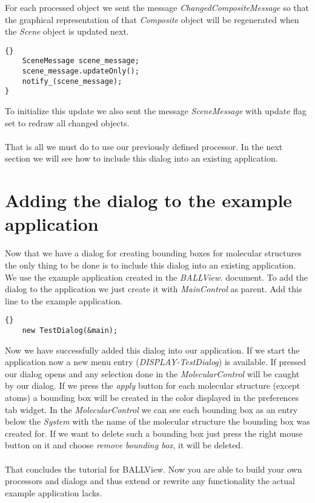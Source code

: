 For each processed object we sent the message {\em ChangedCompositeMessage} so
that the graphical representation of that {\em Composite} object will be regenerated
when the {\em Scene} object is updated next.			

\begin{lstlisting}{}
	SceneMessage scene_message;
	scene_message.updateOnly();
	notify_(scene_message);
}
\end{lstlisting}

To initialize this update we also sent the message {\em SceneMessage} with 
update flag set to redraw all changed objects.\\ \\

That is all we must do to use our previously defined processor. In the next section
we will see how to include this dialog into an existing application.



\section{Adding the dialog to the example application}
\label{section:adding_the_dialog}

Now that we have a dialog for creating bounding boxes for molecular structures
the only thing to be done is to include this dialog into an existing application.
We use the example application created in the {\em BALLView.} document.
To add the dialog to the application we just create it with {\em MainControl}
as parent. Add this line to the example application.

\begin{lstlisting}{}
	new TestDialog(&main);
\end{lstlisting}

Now we have successfully added this dialog into our application. If we start the
application now a new menu entry ({\em DISPLAY-TestDialog}) is available. If pressed our dialog opens and
any selection done in the {\em MolecularControl} will be caught by our dialog. If we press
the {\em apply} button for each molecular structure (except atoms) a bounding box
will be created in the color displayed in the preferences tab widget. In the {\em MolecularControl}
we can see each bounding box as an entry below the {\em System} with the name of
the molecular structure the bounding box was created for.
If we want to delete such a bounding box just press the right mouse button on it and
choose {\em remove bounding box}, it will be deleted.\\ \\

That concludes the tutorial for BALLView. Now you are able to build your own
processors and dialogs and thus extend or rewrite any functionality the actual
example application lacks.
